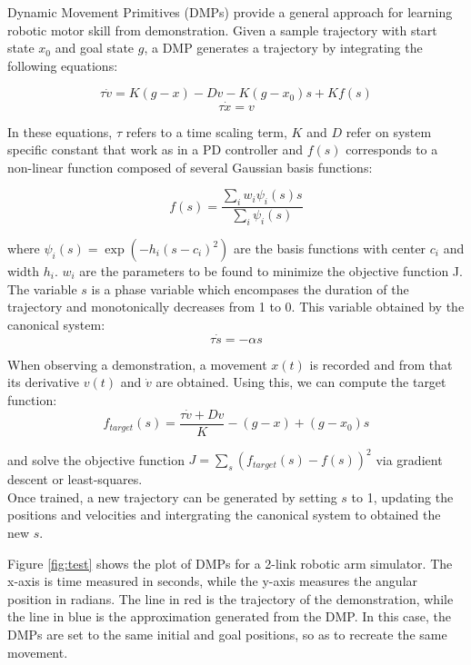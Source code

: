 \documentclass[a4paper]{article}
\begin{document}
\indent \indent Dynamic Movement Primitives (DMPs) provide a general approach for learning robotic motor skill from demonstration. Given a sample trajectory with start state $x_0$ and goal state $g$, a DMP generates a trajectory by integrating the following equations:

$$
\tau \dot{v} = K(g - x) - Dv - K(g - x_0) s + Kf(s)
$$
$$
\tau \dot{x} = v
$$

In these equations, $\tau$ refers to a time scaling term, $K$ and $D$ refer on system specific constant that work as in a PD controller and $f(s)$ corresponds to a non-linear function composed of several Gaussian basis functions:

$$
f(s) = \frac{\sum_i w_i \psi_i(s) s }{\sum_i \psi_i(s)}
$$

where $\psi_i(s) = \exp(-h_i(s-c_i)^2)$ are the basis functions with center $c_i$ and width $h_i$. $w_i$ are the parameters to be found to minimize the objective function J. \\
\indent The variable $s$ is a phase variable which encompases the duration of the trajectory and monotonically decreases from 1 to 0. This variable obtained by the canonical system:
$$
\tau \dot{s} = -\alpha s
$$
 
When observing a demonstration, a movement $x(t)$ is recorded and from that its derivative $v(t)$ and $\dot{v}$ are obtained. Using this, we can compute the target function:
$$
f_{target}(s) = \frac{\tau \dot{v} + Dv}{K} - (g - x) + (g - x_0) s
$$ 

and solve the objective function $J = \sum_s (f_{target}(s) - f(s))^2$ via gradient descent or least-squares. \\
\indent Once trained, a new trajectory can be generated by setting $s$ to 1, updating the positions and velocities and intergrating the canonical system to obtained the new $s$.

Figure \ref{fig:test} shows the plot of DMPs for a 2-link robotic arm simulator. The x-axis is time measured in seconds, while the y-axis measures the angular position in radians. The line in red is the trajectory of the demonstration, while the line in blue is the approximation generated from the DMP. In this case, the DMPs are set to the same initial and goal positions, so as to recreate the same movement.  
 
\end{document}
